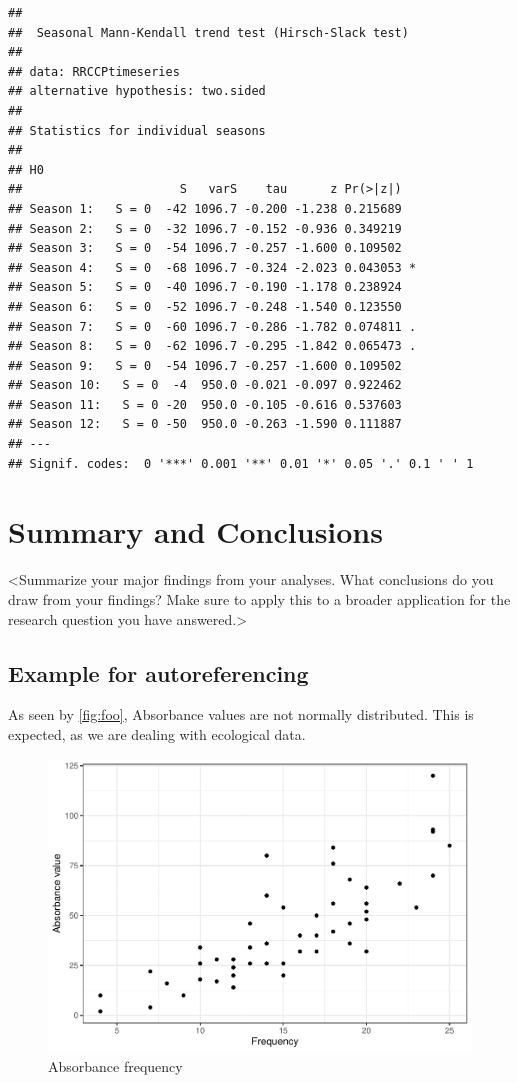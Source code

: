 \documentclass[12pt,]{article}
\begin{document}
\begin{verbatim}
## 
##  Seasonal Mann-Kendall trend test (Hirsch-Slack test)
## 
## data: RRCCPtimeseries
## alternative hypothesis: two.sided
## 
## Statistics for individual seasons
## 
## H0
##                      S   varS    tau      z Pr(>|z|)  
## Season 1:   S = 0  -42 1096.7 -0.200 -1.238 0.215689  
## Season 2:   S = 0  -32 1096.7 -0.152 -0.936 0.349219  
## Season 3:   S = 0  -54 1096.7 -0.257 -1.600 0.109502  
## Season 4:   S = 0  -68 1096.7 -0.324 -2.023 0.043053 *
## Season 5:   S = 0  -40 1096.7 -0.190 -1.178 0.238924  
## Season 6:   S = 0  -52 1096.7 -0.248 -1.540 0.123550  
## Season 7:   S = 0  -60 1096.7 -0.286 -1.782 0.074811 .
## Season 8:   S = 0  -62 1096.7 -0.295 -1.842 0.065473 .
## Season 9:   S = 0  -54 1096.7 -0.257 -1.600 0.109502  
## Season 10:   S = 0  -4  950.0 -0.021 -0.097 0.922462  
## Season 11:   S = 0 -20  950.0 -0.105 -0.616 0.537603  
## Season 12:   S = 0 -50  950.0 -0.263 -1.590 0.111887  
## ---
## Signif. codes:  0 '***' 0.001 '**' 0.01 '*' 0.05 '.' 0.1 ' ' 1
\end{verbatim}

\newpage

\hypertarget{summary-and-conclusions}{%
\section{Summary and Conclusions}\label{summary-and-conclusions}}

\textless{}Summarize your major findings from your analyses. What
conclusions do you draw from your findings? Make sure to apply this to a
broader application for the research question you have
answered.\textgreater{}

\hypertarget{example-for-autoreferencing}{%
\subsection{Example for
autoreferencing}\label{example-for-autoreferencing}}

As seen by \autoref{fig:foo}, Absorbance values are not normally
distributed. This is expected, as we are dealing with ecological data.

\begin{figure}
\centering
\includegraphics{Project_Template_files/figure-latex/foo-1.pdf}
\caption{\label{fig:foo}Absorbance frequency}
\end{figure}
\end{document}
